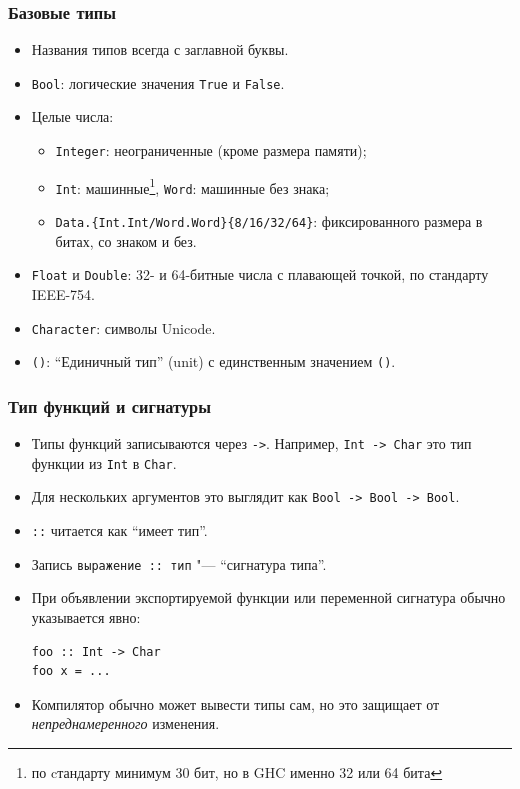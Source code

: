 \documentclass[10pt]{beamer}
\begin{document}
\begin{frame}[fragile]
  \frametitle{Базовые типы}
  \begin{itemize}
    \item Названия типов всегда с заглавной буквы.
    \item \lstinline|Bool|: логические значения \lstinline|True| и \lstinline|False|.
    \item Целые числа:
          \begin{itemize}
            \item \lstinline|Integer|: неограниченные (кроме размера памяти);
            \item \lstinline|Int|: машинные\footnote{по cтандарту минимум 30 бит, но в GHC именно 32 или 64 бита}, \lstinline|Word|: машинные без знака;
            \item \lstinline|Data.{Int.Int/Word.Word}{8/16/32/64}|: фиксированного размера в битах, со знаком и без.
          \end{itemize}
    \item \lstinline|Float| и \lstinline|Double|: 32- и 64-битные числа с плавающей точкой, по стандарту IEEE-754.
    \item \lstinline|Character|: символы Unicode.
    \item \lstinline|()|: \enquote{Единичный тип} (unit) с единственным значением \lstinline|()|.
  \end{itemize}
\end{frame}

\begin{frame}[fragile]
  \frametitle{Тип функций и сигнатуры}
  \begin{itemize}
    \item Типы функций записываются через \lstinline|->|. Например, \lstinline|Int -> Char| это тип функции из \lstinline|Int| в \lstinline|Char|.

    \item Для нескольких аргументов это выглядит как \pause\lstinline|Bool -> Bool -> Bool|.

    \item \lstinline|::| читается как \enquote{имеет тип}.

    \item Запись \lstinline|выражение :: тип| "--- \enquote{сигнатура типа}.

    \item При объявлении экспортируемой функции или переменной  сигнатура обычно указывается явно:
          \begin{lstlisting}
foo :: Int -> Char
foo x = ...
\end{lstlisting}
    \item Компилятор обычно может вывести типы сам, но это защищает от \emph{непреднамеренного} изменения.
  \end{itemize}
\end{frame}
\end{document}
